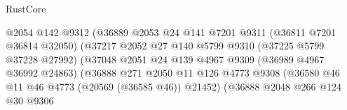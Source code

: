 \begin{lexlean}{RustCore}
\begin{coremodule}
                                              @2054
                                              @142
                                              @9312
                                              (@36889
                                                @2053
                                                @24
                                                @141
                                                @7201
                                                @9311
                                                (@36811 @7201 @36814 @32050)
                                                (@37217
                                                  @2052
                                                  @27
                                                  @140
                                                  @5799
                                                  @9310
                                                  (@37225 @5799 @37228 @27992)
                                                  (@37048
                                                    @2051
                                                    @24
                                                    @139
                                                    @4967
                                                    @9309
                                                    (@36989 @4967 @36992 @24863)
                                                    (@36888
                                                      @271
                                                      @2050
                                                      @11
                                                      @126
                                                      @4773
                                                      @9308
                                                      (@36580
                                                        @46
                                                        @11
                                                        @46
                                                        @4773
                                                        (@20569 (@36585 @46))
                                                        @21452)
                                                      (@36888
                                                        @2048
                                                        @266
                                                        @124
                                                        @30
                                                        @9306

\end{coremodule}
\end{lexlean}
